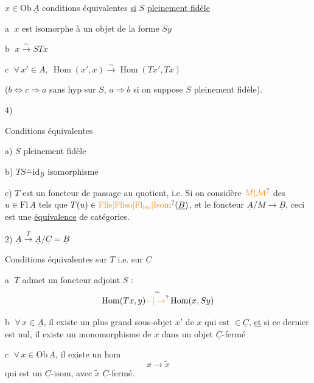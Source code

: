 $x\in\mathrm{Ob}\,\underline A$ conditions équivalentes \uline{si} $S$ \uline{pleinement fidèle}

\textcircled{a} $x$ est isomorphe à un objet de la forme $Sy$

\textcircled{b} $x\xrightarrow{\sim}STx$

\textcircled{c} $\forall\,x'\in A,\ \operatorname{Hom}(x',x)\xrightarrow{\sim}\operatorname{Hom}(Tx',Tx)$

($b\Leftrightarrow c\Rightarrow a$ sans hyp sur $S$, $a\Rightarrow b$ si on suppose $S$ pleinement fidèle).

4)

Conditions équivalentes

a) $S$ pleinement fidèle

b) $TS\overset{\sim}{-}\mathrm{id}_{\underline B}$ isomorphisme

c) $T$ est un foncteur de passage au quotient, i.e. Si on considère  $\unsure{M|\mathcal M}$ des $u\in\mathrm{Fl}\,\underline A$ tels que $T(u)\in\unsure{\mathrm{Flis}|\mathrm{Fliso}|\mathrm{Fl}_{\rm iso}|\mathrm{Isom}}(\underline B)$, et le foncteur $\underline A/M\to\underline B$, ceci est une \uline{équivalence} de catégories.

2) $\underline A\xrightarrow{T}\underline A/\underline C=\underline B$

Conditions équivalentes sur $T$ i.e. sur $\underline C$

\textcircled{a} $T$ admet un foncteur adjoint $S$ :
\[
\operatorname{Hom}(Tx,y)\overset{\sim}{\unsure{\mathord{-}|\to}}\operatorname{Hom}(x,Sy)
\]

\textcircled{b} $\forall\, x\in\underline A$, il existe un plus grand sous-objet $x'$ de $x$ qui est $\in\underline C$, \uline{et} si ce dernier est nul, il existe un monomorphisme de $x$ dans un objet $\underline C$-fermé

\textcircled{c} $\forall\,x\in\mathrm{Ob}\,\underline A$, il existe un hom
\[
x\longrightarrow\tilde x
\]
qui est un $\underline C$-isom, avec $\tilde x$ $\underline C$-fermé.

